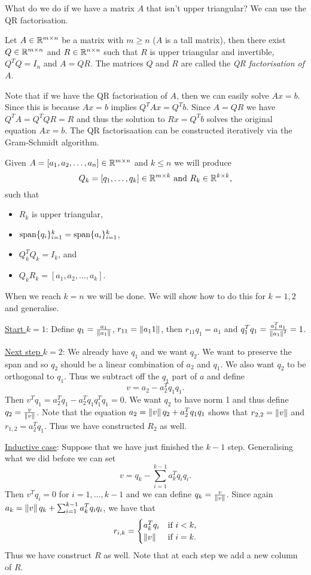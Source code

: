 What do we do if we have a matrix $A$ that isn't upper triangular? We can use the QR factorisation.

\begin{thrm}
    Let $A \in {\mathbb R}^{m \times n}$ be a matrix with $m \ge n$ ($A$ is a tall matrix), then there exist $Q \in {\mathbb R}^{m \times n}$ and $R \in {\mathbb R}^{n \times n}$ such that $R$ is upper triangular and invertible, $Q^TQ = I_n$ and $A = QR$. The matrices $Q$ and $R$ are called the \emph{QR factorisation of $A$}.
\end{thrm}
Note that if we have the QR factorisation of $A$, then we can easily solve $Ax = b$. Since this is because $Ax = b$ implies $Q^TAx=Q^Tb$. Since $A = QR$ we have $Q^TA = Q^TQR = R$ and thus the solution to $Rx=Q^Tb$ solves the original equation $Ax = b$. The QR factorisaation can be constructed iteratively via the Gram-Schmidt algorithm. 

Given $A = [a_1,a_2,\ldots,a_n] \in {\mathbb R}^{m \times n}$ and $k \le n$ we will produce 
\[Q_k=[q_1,\ldots,q_k] \in {\mathbb R}^{m\times k} \text{ and } R_k \in {\mathbb R}^{k \times k},  \]
such that 
\begin{itemize}
    \item $R_k$ is upper triangular, 
    \item $\operatorname{span}\{q_i\}_{i=1}^k = \operatorname{span}\{a_i\}_{i=1}^k$, 
    \item $Q^T_kQ_k = I_k$, and 
    \item $Q_kR_k = [a_1,a_2,\ldots, a_k]$. 
\end{itemize}    
When we reach $k=n$ we will be done. We will show how to do this for $k=1,2$ and generalise.

\underline{Start $k=1$}: Define $q_1 = \frac{a_1}{\left\|a_1\right\|}$, $r_{11} = \left\|a_11\right\|$, then $r_{11}q_1 = a_1$ and $q_1^Tq_1 = \frac{a_1^Ta_1}{\left\|a_1\right\|^2}=1$.

\underline{Next step $k=2$}: We already have $q_1$ and we want $q_2$. We want to preserve the span and so $q_2$ should be a linear combination of $a_2$ and $q_1$. We also want $q_2$ to be orthogonal to $q_1$. Thus we subtract off the $q_1$ part of $a$ and define 
\[v = a_2 - a_2^Tq_1 q_1. \]
Then $v^Tq_1 = a_2^Tq_1 - a_2^Tq_1 q_1^Tq_1 = 0$. We want $q_2$ to have norm 1 and thus define $q_2 = \frac{v}{\left\|v\right\|}$. Note that the equation $a_2 = \left\|v\right\|q_2+a_2^Tq_1q_1$ shows that $r_{2,2} = \left\|v\right\|$ and $r_{1,2} = a_2^Tq_1$. Thus we have constructed $R_2$ as well.

\underline{Inductive case}: Suppose that we have just finished the $k-1$ step. Generalising what we did before we can set
\[v = q_k - \sum_{i=1}^{k-1}a_k^Tq_iq_i. \]
Then $v^Tq_i = 0$ for $i=1,\ldots,k-1$ and we can define $q_k = \frac{v}{\left\|v\right\|}$. Since again $a_k = \left\|v\right\|q_k + \sum_{i=1}^{k-1}a_k^Tq_iq_i$, we have that
\[r_{i,k} = \begin{cases}
    a_k^Tq_i & \text{if } i < k,\\
    \left\|v\right\| & \text{if } i = k.
\end{cases} \]
Thus we have construct $R$ as well. Note that at each step we add a new column of $R$.

